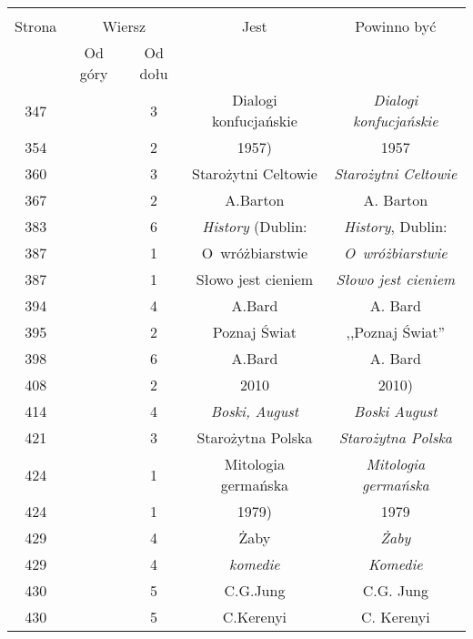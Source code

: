 \documentclass[a4paper,11pt]{article}
\begin{document}
\begin{center}
  \begin{tabular}{|c|c|c|c|c|}
    \hline
    & \multicolumn{2}{c|}{} & & \\
    Strona & \multicolumn{2}{c|}{Wiersz} & Jest
                              & Powinno być \\ \cline{2-3}
    & Od góry & Od dołu & & \\
    \hline
    347 & &  3 & Dialogi konfucjańskie & \emph{Dialogi konfucjańskie} \\
    354 & &  2 & 1957) & 1957 \\
    360 & &  3 & Starożytni Celtowie & \emph{Starożytni Celtowie} \\
    367 & &  2 & A.Barton & A. Barton \\
    383 & &  6 & \emph{History} (Dublin: & \emph{History}, Dublin: \\
    387 & &  1 & O~wróżbiarstwie & \emph{O~wróżbiarstwie} \\
    387 & &  1 & Słowo jest cieniem & \emph{Słowo jest cieniem} \\
    394 & &  4 & A.Bard & A. Bard \\
    395 & &  2 & Poznaj Świat & ,,Poznaj Świat'' \\
    398 & &  6 & A.Bard & A. Bard \\
    408 & &  2 & 2010 & 2010) \\
    414 & &  4 & \emph{Boski, August} & \emph{Boski August} \\
    421 & &  3 & Starożytna Polska & \emph{Starożytna Polska} \\
    424 & &  1 & Mitologia germańska & \emph{Mitologia germańska} \\
    424 & &  1 & 1979) & 1979 \\
    429 & &  4 & Żaby & \emph{Żaby} \\
    429 & &  4 & \emph{komedie} & \emph{Komedie} \\
    430 & &  5 & C.G.Jung & C.G. Jung \\
    430 & &  5 & C.Kerenyi & C. Kerenyi \\
    \hline
  \end{tabular}


\end{center}
\end{document}
